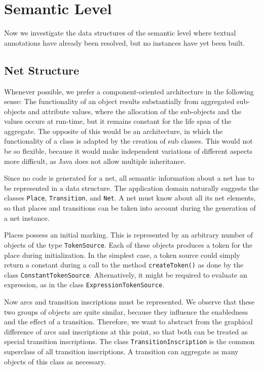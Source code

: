 \section{Semantic Level}

Now we investigate the data structures of the semantic level where textual
annotations have already been resolved, but no instances 
have yet been built.

\subsection{Net Structure}

Whenever possible, we prefer a component-oriented 
architecture in the following sense:
The functionality of an object results substantially from
aggregated sub-objects and attribute values, where the allocation of the
sub-objects and the values occurs at run-time, but it remains constant for
the life span of the aggregate. The opposite of this would be an architecture,
in which the functionality of a class is
adapted by the creation of sub classes. 
This would not be so flexible, because it would make
independent variations of different aspects more difficult,
as Java does not allow multiple inheritance.

Since no code is generated for a net, all semantic information about a net
has to be represented in a data structure. The application domain
naturally suggests the classes \texttt{Place}, \texttt{Transition},
and \texttt{Net}. A net must know about all its net
elements, so that places and transitions can be taken into account during
the generation of a net instance.

Places possess an initial marking. This is represented by an
arbitrary number of objects of the type \texttt{TokenSource}.
Each of these objects
produces a token for the place during initialization. In the simplest case,
a token source could simply return a constant during a call to the method
\texttt{createToken()} as done by the class \texttt{ConstantTokenSource}.
Alternatively, it might be required to evaluate an expression,
as in the class \texttt{ExpressionTokenSource}.

Now arcs and transition inscriptions must be represented. We
observe that these two groups of objects are quite similar, because they
influence the enabledness and the effect of a transition. 
Therefore, we want to abstract from the graphical difference
of arcs and inscriptions at this point, so that both can be treated
as special transition inscriptions. 
The class \texttt{TransitionInscription} is 
the common superclass of all transition
inscriptions. A transition can aggregate as many objects of
this class as necessary.

